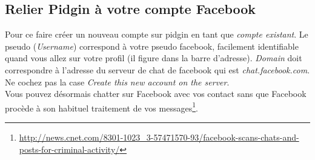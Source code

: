 \documentclass[a4paper]{article}
\begin{document}
\subsection{Relier Pidgin à votre compte Facebook}
Pour ce faire créer un nouveau compte sur pidgin en tant que \emph{compte existant}.
Le pseudo (\emph{Username}) correspond à votre pseudo facebook, facilement identifiable quand vous
allez sur votre profil (il figure dans la barre d'adresse).
\emph{Domain} doit correspondre à l'adresse du serveur de chat de facebook qui est
\emph{chat.facebook.com}. Ne cochez pas la case \emph{Create this new account on the server}.
\\
Vous pouvez désormais chatter sur Facebook avec vos contact sans que Facebook
procède à son habituel traitement de vos messages\protect\footnote{\url{http://news.cnet.com/8301-1023_3-57471570-93/facebook-scans-chats-and-posts-for-criminal-activity/}}.
\end{document}
